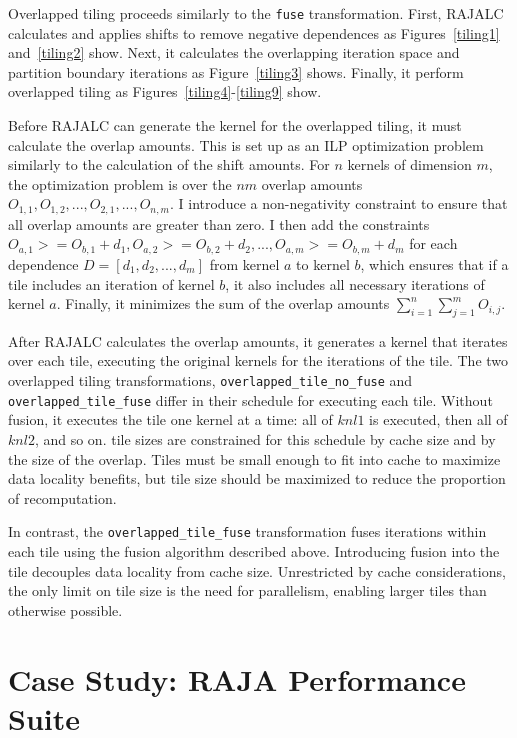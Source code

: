 Overlapped tiling proceeds similarly to the \verb.fuse. transformation. 
First, RAJALC calculates and applies shifts to remove negative dependences as
Figures~\ref{tiling1} and~\ref{tiling2} show.
Next, it calculates the overlapping iteration space and partition boundary
iterations as Figure~\ref{tiling3} shows.
Finally, it perform overlapped tiling as Figures~\ref{tiling4}-\ref{tiling9} show.

Before RAJALC can generate the kernel for the overlapped tiling, it must
calculate the overlap amounts. 
This is set up as an ILP optimization problem similarly to the calculation of the
shift amounts.
For $n$ kernels of dimension $m$, the optimization problem is over the $nm$
overlap amounts $O_{1,1},O_{1,2},...,O_{2,1},...,O_{n,m}$.
I introduce a non-negativity constraint to ensure that all overlap amounts
are greater than zero. 
I then add the constraints
$O_{a,1} >= O_{b,1} + d_{1}, O_{a,2} >= O_{b,2} + d_{2},...,O_{a,m} >= O_{b,m} + d_{m}$
for each dependence $D=[d_{1},d_{2},...,d_{m}]$ from kernel $a$ to kernel $b$,
which ensures that if a tile includes an iteration of kernel $b$, it also
includes all necessary iterations of kernel $a$.
Finally, it minimizes the sum of the overlap amounts
$\sum_{i=1}^{n} \sum_{j=1}^{m} O_{i,j}$.

After RAJALC calculates the overlap amounts, it generates a kernel that iterates
over each tile, executing the original kernels for the iterations of the tile.
The two overlapped tiling transformations, \verb.overlapped_tile_no_fuse.
and \verb.overlapped_tile_fuse. differ in their schedule for executing each
tile.
Without fusion, it executes the tile one kernel at a time: all of $knl1$ is
executed, then all of $knl2$, and so on. 
tile sizes are constrained for this schedule by cache size and by the size of
the overlap. 
Tiles must be small enough to fit into cache to maximize data locality
benefits, but tile size should be maximized to reduce the proportion of
recomputation.

In contrast, the \verb.overlapped_tile_fuse. transformation fuses iterations
within each tile using the fusion algorithm described above.
Introducing fusion into the tile decouples data locality from cache size.
Unrestricted by cache considerations, the only limit on tile size is the
need for parallelism, enabling larger tiles than otherwise possible.

\section{Case Study: RAJA Performance Suite}


